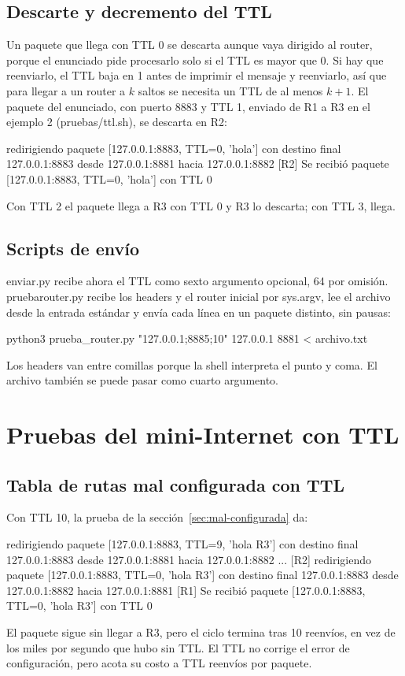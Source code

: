 \documentclass[
	spanish, %
	letterpaper, oneside
]{article}
\newcommand{\codeunderscore}{\textunderscore\allowbreak}
\newcommand{\code}[1]{{\let\_\codeunderscore#1}}     %
\begin{document}
\subsection{Descarte y decremento del TTL}
Un paquete que llega con TTL 0 se descarta aunque vaya dirigido al router, porque el enunciado pide procesarlo solo si el TTL es mayor que 0. Si hay que reenviarlo, el TTL baja en 1 antes de imprimir el mensaje y reenviarlo, así que para llegar a un router a $k$ saltos se necesita un TTL de al menos $k + 1$. El paquete del enunciado, con puerto 8883 y TTL 1, enviado de R1 a R3 en el ejemplo 2 (\code{pruebas/ttl.sh}), se descarta en R2:
\begin{salida}
[R1] redirigiendo paquete [127.0.0.1:8883, TTL=0, 'hola'] con destino final 127.0.0.1:8883 desde 127.0.0.1:8881 hacia 127.0.0.1:8882
[R2] Se recibió paquete [127.0.0.1:8883, TTL=0, 'hola'] con TTL 0
\end{salida}
Con TTL 2 el paquete llega a R3 con TTL 0 y R3 lo descarta; con TTL 3, llega.

\subsection{Scripts de envío}
\code{enviar.py} recibe ahora el TTL como sexto argumento opcional, 64 por omisión. \code{prueba\_router.py} recibe los headers y el router inicial por \code{sys.argv}, lee el archivo desde la entrada estándar y envía cada línea en un paquete distinto, sin pausas:
\begin{salida}
python3 prueba_router.py "127.0.0.1;8885;10" 127.0.0.1 8881 < archivo.txt
\end{salida}
Los headers van entre comillas porque la shell interpreta el punto y coma. El archivo también se puede pasar como cuarto argumento.

\section{Pruebas del mini-Internet con TTL}

\subsection{Tabla de rutas mal configurada con TTL}
Con TTL 10, la prueba de la sección~\ref{sec:mal-configurada} da:
\begin{salida}
[R1] redirigiendo paquete [127.0.0.1:8883, TTL=9, 'hola R3'] con destino final 127.0.0.1:8883 desde 127.0.0.1:8881 hacia 127.0.0.1:8882
...
[R2] redirigiendo paquete [127.0.0.1:8883, TTL=0, 'hola R3'] con destino final 127.0.0.1:8883 desde 127.0.0.1:8882 hacia 127.0.0.1:8881
[R1] Se recibió paquete [127.0.0.1:8883, TTL=0, 'hola R3'] con TTL 0
\end{salida}
El paquete sigue sin llegar a R3, pero el ciclo termina tras 10 reenvíos, en vez de los miles por segundo que hubo sin TTL. El TTL no corrige el error de configuración, pero acota su costo a TTL reenvíos por paquete.
\end{document}
